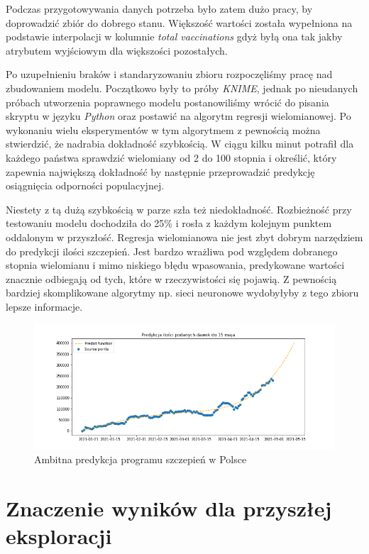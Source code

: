 \documentclass[12pt, oneside]{article}
\begin{document}
Podczas przygotowywania danych potrzeba było zatem dużo pracy, by doprowadzić zbiór do dobrego stanu. Większość wartości została wypełniona na podstawie interpolacji w kolumnie \textit{total vaccinations} gdyż byłą ona tak jakby atrybutem wyjściowym dla większości pozostałych. 

Po uzupełnieniu braków i standaryzowaniu zbioru rozpoczęliśmy pracę nad zbudowaniem modelu. Początkowo były to próby \textit{KNIME}, jednak po nieudanych próbach utworzenia poprawnego modelu postanowiliśmy wrócić do pisania skryptu w języku \textit{Python} oraz postawić na algorytm regresji wielomianowej. Po wykonaniu wielu eksperymentów w tym algorytmem z pewnością można stwierdzić, że nadrabia dokładność szybkością. W ciągu kilku minut potrafił dla każdego państwa sprawdzić wielomiany od 2 do 100 stopnia i określić, który zapewnia największą dokładność by następnie przeprowadzić predykcję osiągnięcia odporności populacyjnej. 

Niestety z tą dużą szybkością w parze szła też niedokładność. Rozbieżność przy testowaniu modelu dochodziła do 25\% i rosła z każdym kolejnym punktem oddalonym w przyszłość. Regresja wielomianowa nie jest zbyt dobrym narzędziem do predykcji ilości szczepień. Jest bardzo wrażliwa pod względem dobranego stopnia wielomianu i mimo niskiego błędu wpasowania, predykowane wartości znacznie odbiegają od tych, które w rzeczywistości się pojawią. Z pewnością bardziej skomplikowane algorytmy np. sieci neuronowe wydobyłyby z tego zbioru lepsze informacje. 

\begin{figure}[h!]
\centering
\includegraphics[height=0.25\textheight]{../img/demand1.png} 
\caption{Ambitna predykcja programu szczepień w Polsce}
\label{Rys:poland}
\end{figure}

\section{Znaczenie wyników dla przyszłej eksploracji}
\end{document}
